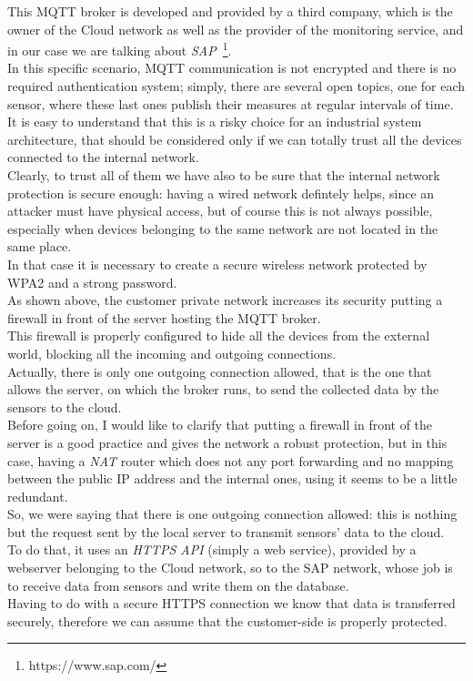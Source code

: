 \documentclass[12pt]{report}
\begin{document}
{{This MQTT broker is developed and provided by a third company, which is the owner of the Cloud network as well as the provider of the monitoring service, and in our case we are talking about \emph{SAP}~\footnote{https://www.sap.com/}.\\
In this specific scenario, MQTT communication is not encrypted and there is no required authentication system; simply, there are several open topics, one for each sensor, where these last ones publish their measures at regular intervals of time.\\
It is easy to understand that this is a risky choice for an industrial system architecture, that should be considered only if we can totally trust all the devices connected to the internal network.\\
Clearly, to trust all of them we have also to be sure that the internal network protection is secure enough: having a wired network defintely helps, since an attacker must have physical access, but of course this is not always possible, especially when devices belonging to the same network are not located in the same place.\\
In that case it is necessary to create a secure wireless network protected by WPA2 and a strong password.\\

As shown above, the customer private network increases its security putting a firewall in front of the server hosting the MQTT broker.\\
This firewall is properly configured to hide all the devices from the external world, blocking all the incoming and outgoing connections.\\
Actually, there is only one outgoing connection allowed, that is the one that allows the server, on which the broker runs, to send the collected data by the sensors to the cloud.\\
Before going on, I would like to clarify that putting a firewall in front of the server is a good practice and gives the network a robust protection, but in this case, having a \emph{NAT} router which does not any port forwarding and no mapping between the public IP address and the internal ones, using it seems to be a little redundant.\\

So, we were saying that there is one outgoing connection allowed: this is nothing but the request sent by the local server to transmit sensors' data to the cloud.\\
To do that, it uses an \emph{HTTPS API} (simply a web service), provided by a webserver belonging to the Cloud network, so to the SAP network, whose job is to receive data from sensors and write them on the database.\\
Having to do with a secure HTTPS connection we know that data is transferred securely, therefore we can assume that the customer-side is properly protected.\\

}}
\end{document}
